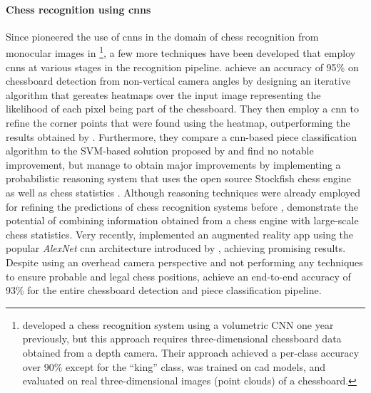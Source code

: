 \documentclass[../../main.tex]{subfiles}
\begin{document}
\paragraph{Chess recognition using \glspl{cnn}}
Since \citeauthor{xie2018} pioneered the use of \glspl{cnn} in the domain of chess recognition from monocular images in \citeyear{xie2018}%
\footnote{%
    \textcite{wei2017} developed a chess recognition system using a volumetric CNN one year previously, but this approach requires three-dimensional chessboard data obtained from a depth camera. 
    Their approach achieved a per-class accuracy over 90\% except for the ``king'' class, was trained on \gls{cad} models, and evaluated on real three-dimensional images (point clouds) of a chessboard.
},
a few more techniques have been developed that employ \glspl{cnn} at various stages in the recognition pipeline.
\textcite{czyzewski2020} achieve an accuracy of 95\% on chessboard detection from non-vertical camera angles by designing an iterative algorithm that gereates heatmaps over the input image representing the likelihood of each pixel being part of the chessboard. 
They then employ a \gls{cnn} to refine the corner points that were found using the heatmap, outperforming the results obtained by \textcite{goncalves2005}.
Furthermore, they compare a \gls{cnn}-based piece classification algorithm to the SVM-based solution proposed by \textcite{ding2016} and find no notable improvement, but manage to obtain major improvements by implementing a probabilistic reasoning system that uses the open source Stockfish chess engine \cite{romstad2020} as well as chess statistics \cite{acher2016}.
Although reasoning techniques were already employed for refining the predictions of chess recognition systems before \cite{neufeld2010,danner2015}, \citeauthor{czyzewski2020} demonstrate the potential of combining information obtained from a chess engine with large-scale chess statistics.  
Very recently, \textcite{mehta2020} implemented an augmented reality app using the popular \emph{AlexNet} \gls{cnn} architecture introduced by \textcite{krizhevsky2017}, achieving promising results.
Despite using an overhead camera perspective and not performing any techniques to ensure probable and legal chess positions, \citeauthor{mehta2020} achieve an end-to-end accuracy of 93\% for the entire chessboard detection and piece classification pipeline.
\end{document}
